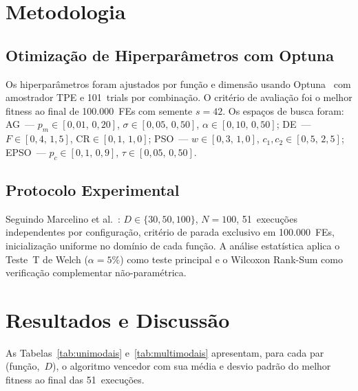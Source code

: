 \documentclass[runningheads]{llncs}
\begin{document}
\section{Metodologia}
\label{sec:metodologia}

\subsection{Otimização de Hiperpar\^{a}metros com Optuna}

Os hiperparâmetros foram ajustados por função e dimensão usando
Optuna~\cite{akiba2019} com amostrador TPE e 101~trials por
combinação. O critério de avaliação foi o melhor fitness ao final
de 100.000~FEs com semente $s=42$. Os espaços de busca foram:
AG~— $p_m\!\in\![0{,}01,\,0{,}20]$,
$\sigma\!\in\![0{,}05,\,0{,}50]$,
$\alpha\!\in\![0{,}10,\,0{,}50]$;
DE~— $F\!\in\![0{,}4,\,1{,}5]$, $\text{CR}\!\in\![0{,}1,\,1{,}0]$;
PSO~— $w\!\in\![0{,}3,\,1{,}0]$, $c_1,c_2\!\in\![0{,}5,\,2{,}5]$;
EPSO~— $p_c\!\in\![0{,}1,\,0{,}9]$, $\tau\!\in\![0{,}05,\,0{,}50]$.

\subsection{Protocolo Experimental}

Seguindo Marcelino et al.~\cite{marcelino2018}: $D\in\{30,50,100\}$,
$N=100$, 51~execuções independentes por configuração, critério de
parada exclusivo em 100.000~FEs, inicialização uniforme no domínio
de cada função. A análise estatística aplica o Teste~T de Welch
($\alpha=5\%$) como teste principal e o Wilcoxon Rank-Sum como
verificação complementar não-paramétrica.

\section{Resultados e Discuss\~{a}o}
\label{sec:resultados}

As Tabelas~\ref{tab:unimodais} e~\ref{tab:multimodais} apresentam,
para cada par (função,~$D$), o algoritmo vencedor com sua média e
desvio padrão do melhor fitness ao final das 51~execuções.
\end{document}

